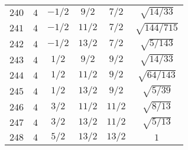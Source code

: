 \begin{table}
\begin{center}
\begin{tabular}{|c|c|c|c|c|c|}
$240$ & $4$ & $-1/2$ & $9/2$ & $7/2$ & $\sqrt{14/33}$ \\ 
$241$ & $4$ & $-1/2$ & $11/2$ & $7/2$ & $\sqrt{144/715}$ \\ 
$242$ & $4$ & $-1/2$ & $13/2$ & $7/2$ & $\sqrt{5/143}$ \\ 
$243$ & $4$ & $1/2$ & $9/2$ & $9/2$ & $\sqrt{14/33}$ \\ 
$244$ & $4$ & $1/2$ & $11/2$ & $9/2$ & $\sqrt{64/143}$ \\ 
$245$ & $4$ & $1/2$ & $13/2$ & $9/2$ & $\sqrt{5/39}$ \\ 
$246$ & $4$ & $3/2$ & $11/2$ & $11/2$ & $\sqrt{8/13}$ \\ 
$247$ & $4$ & $3/2$ & $13/2$ & $11/2$ & $\sqrt{5/13}$ \\ 
$248$ & $4$ & $5/2$ & $13/2$ & $13/2$ & $1$ \\ 
\hline 
\end{tabular}
\end{center}
\end{table}

